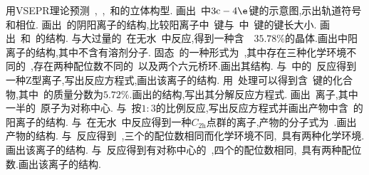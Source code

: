 \documentclass{ctexbook}
\begin{document}
\begin{problem}{}
    \subproblem 用VSEPR理论预测~,~,~和的立体构型.
    \subproblem 画出~中$3\text{c}-4\e$键的示意图,示出轨道符号和相位.
    \subsubproblem 画出~\ce{[KrF][SbF6]}的阴阳离子的结构,比较阳离子中~键与~中~键的键长大小.
    \subsubproblem 画出~和~的结构.
    \subsubproblem {}与大过量的~在无水~中反应,得到一种含~~$35.78\%$的晶体.画出中阳离子的结构,其中不含有溶剂分子.
    \subproblem 固态~的一种形式为~,其中存在三种化学环境不同的~,存在两种配位数不同的~以及两个六元桥环.画出其结构.
    \subsubproblem \ce{[XeF][AsF6]}与~中的~反应得到一种Z型离子,写出反应方程式,画出该离子的结构.
    \subsubproblem 用~处理\ce{[XeF][SbF6]}可以得到含~键的化合物,其中~的质量分数为$5.72\%$.画出的结构,写出其分解反应方程式.
    \subproblem 画出~离子,其中一半的~原子为对称中心.
    \subproblem \ce{[C6F5Xe]+[AsF6]-}与~按$1:3$的比例反应,写出反应方程式并画出产物中含~的阳离子的结构.
    \subproblem {}与~在无水~中反应得到一种$C_{2\text{h}}$点群的离子,产物的分子式为~.画出产物的结构.
    \subsubproblem {}与~反应得到~,三个的配位数相同而化学环境不同,~具有两种化学环境.画出该离子的结构.
    \subsubproblem {}与~反应得到有对称中心的~,四个的配位数相同,~具有两种配位数.画出该离子的结构.
\end{problem}
\printbibliography[title={\Large 参考文献}]
\end{document}
